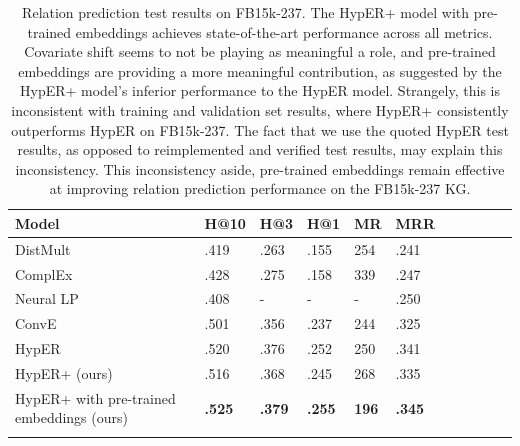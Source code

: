 \begin{table}
		\centering
		\begin{tabular}{lllllllllll}
  			\textbf{Model} & \textbf{H@10} & \textbf{H@3} & \textbf{H@1} & \textbf{MR} & \textbf{MRR} \\
  			\hline
  			DistMult \unskip~\citep{yang2014embedding} & .419 & .263 & .155 & 254 & .241 \\
  			ComplEx \unskip~\citep{trouillon2016complex} & .428 & .275 & .158 & 339 & .247 \\
  			Neural LP  \unskip~\citep{yang2017differentiable} & .408 & - & - & - & .250 \\
			ConvE \unskip~\citep{dettmers2018convolutional} & .501 & .356 & .237 & 244 & .325 \\
			HypER \unskip~\citep{balazevic2019hypernetwork} & .520 & .376 & .252 & 250 & .341 \\
			HypER+ (ours) & .516 & .368 & .245 & 268 & .335 \\
  			\hline
  			HypER+ with pre-trained embeddings (ours) & \textbf{.525} & \textbf{.379} & \textbf{.255} & \textbf{196} & \textbf{.345} \\
			&
		\end{tabular}
		\captionsetup{justification=centering}
		\caption{Relation prediction test results on FB15k-237. The HypER+ model with pre-trained embeddings achieves state-of-the-art performance across all metrics. Covariate shift seems to not be playing as meaningful a role, and pre-trained embeddings are providing a more meaningful contribution, as suggested by the HypER+ model's inferior performance to the HypER model. Strangely, this is inconsistent with training and validation set results, where HypER+ consistently outperforms HypER on FB15k-237. The fact that we use the quoted HypER test results, as opposed to reimplemented and verified test results, may explain this inconsistency. This inconsistency aside, pre-trained embeddings remain effective at improving relation prediction performance on the FB15k-237 KG.}
\end{table}



